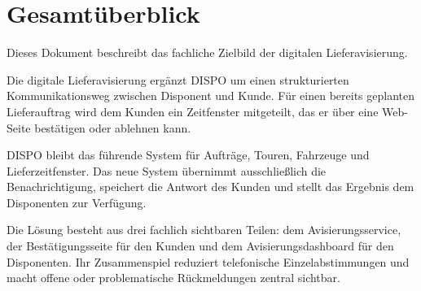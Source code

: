 \section{Gesamtüberblick}

Dieses Dokument beschreibt das fachliche Zielbild der digitalen Lieferavisierung.

Die digitale Lieferavisierung ergänzt DISPO um einen strukturierten Kommunikationsweg
zwischen Disponent und Kunde. Für einen bereits geplanten Lieferauftrag wird dem Kunden ein
Zeitfenster mitgeteilt, das er über eine Web-Seite bestätigen oder ablehnen kann.

DISPO bleibt das führende System für Aufträge, Touren, Fahrzeuge und Lieferzeitfenster. Das
neue System übernimmt ausschlie\ss{}lich die Benachrichtigung, speichert die Antwort des Kunden
und stellt das Ergebnis dem Disponenten zur Verfügung.

Die Lösung besteht aus drei fachlich sichtbaren Teilen: dem Avisierungsservice, der
Bestätigungsseite für den Kunden und dem Avisierungsdashboard für den Disponenten. Ihr
Zusammenspiel reduziert telefonische Einzelabstimmungen und macht offene oder problematische
Rückmeldungen zentral sichtbar.

